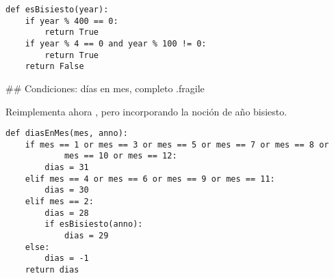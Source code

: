 
\trmcolumns

\vspace{-2ex}
\bgncolumns
{}


\begin{lstlisting}[style=frame02]
def esBisiesto(year):
    if year % 400 == 0:
        return True
    if year % 4 == 0 and year % 100 != 0:
        return True
    return False
\end{lstlisting}


\trmcolumns

## Condiciones: días en mes, completo {.fragile}

\bgnblockgood
Reimplementa ahora , pero incorporando la noción de año bisiesto.
\trmblockgood

\pause

\begin{lstlisting}[style=frame02]
def diasEnMes(mes, anno):
    if mes == 1 or mes == 3 or mes == 5 or mes == 7 or mes == 8 or
            mes == 10 or mes == 12:
        dias = 31
    elif mes == 4 or mes == 6 or mes == 9 or mes == 11:
        dias = 30
    elif mes == 2:
        dias = 28
        if esBisiesto(anno):
            dias = 29
    else:
        dias = -1
    return dias
\end{lstlisting}

